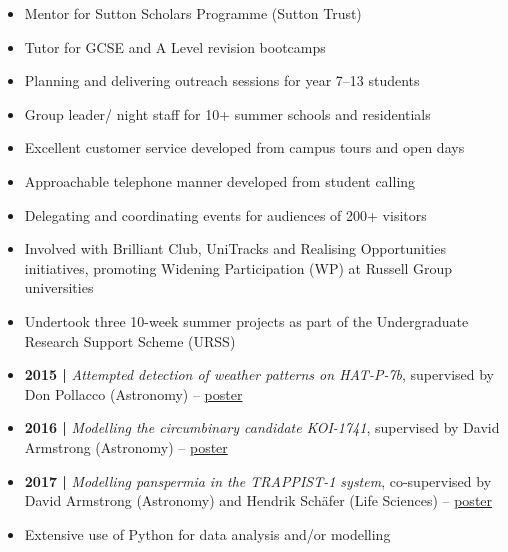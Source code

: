 \documentclass[10pt,a4paper]{altacv}
\begin{document}
\divider

\begin{itemize}
	\item Mentor for Sutton Scholars Programme (Sutton Trust)
	\item Tutor for GCSE and A Level revision bootcamps
	\item Planning and delivering outreach sessions for year 7--13 students
	\item Group leader/ night staff for 10+ summer schools and residentials
	\item Excellent customer service developed from campus tours and open days
	\item Approachable telephone manner developed from student calling
	\item Delegating and coordinating events for audiences of 200+ visitors
	\item Involved with Brilliant Club, UniTracks and Realising Opportunities initiatives, promoting Widening Participation (WP) at Russell Group universities
\end{itemize}

\divider

\begin{itemize}
	\item Undertook three 10-week summer projects as part of the Undergraduate Research Support Scheme (URSS)
	\item \textbf{2015 |} \textit{Attempted detection of weather patterns on HAT-P-7b}, supervised by Don Pollacco (Astronomy) -- \href{https://warwick.ac.uk/fac/sci/physics/research/astro/people/jamesblake/urss_poster_2015_jb.pdf}{poster}
	\item \textbf{2016 |} \textit{Modelling the circumbinary candidate KOI-1741}, supervised by David Armstrong (Astronomy) -- \href{https://warwick.ac.uk/fac/sci/physics/research/astro/people/jamesblake/urss_poster_2016_jb.pdf}{poster}
	\item \textbf{2017 |} \textit{Modelling panspermia in the TRAPPIST-1 system}, co-supervised by David Armstrong (Astronomy) and Hendrik Sch{\"a}fer (Life Sciences) -- \href{https://warwick.ac.uk/fac/sci/physics/research/astro/people/jamesblake/urss_poster_2017_jb.pdf}{poster}
	\item Extensive use of Python for data analysis and/or modelling
\end{itemize}
\end{document}
